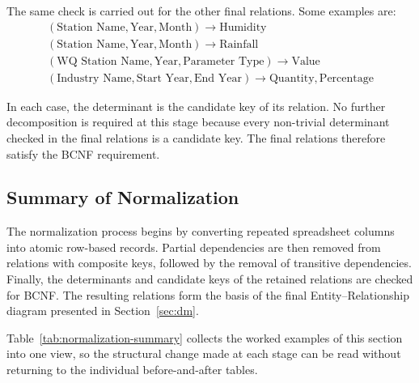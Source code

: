 The same check is carried out for the other final relations. Some examples are:
\begin{gather*}
(\text{Station Name},\text{Year},\text{Month})\rightarrow \text{Humidity}\\
(\text{Station Name},\text{Year},\text{Month})\rightarrow \text{Rainfall}\\
(\text{WQ Station Name},\text{Year},\text{Parameter Type})
\rightarrow \text{Value}\\
(\text{Industry Name},\text{Start Year},\text{End Year})
\rightarrow \text{Quantity},\text{Percentage}
\end{gather*}

In each case, the determinant is the candidate key of its relation. No further
decomposition is required at this stage because every non-trivial determinant
checked in the final relations is a candidate key. The final relations
therefore satisfy the BCNF requirement.

\subsection{Summary of Normalization}
\label{subsec:normalization-summary}

The normalization process begins by converting repeated spreadsheet columns
into atomic row-based records. Partial dependencies are then removed from
relations with composite keys, followed by the removal of transitive
dependencies. Finally, the determinants and candidate keys of the retained
relations are checked for BCNF. The resulting relations form the basis of the
final Entity--Relationship diagram presented in Section~\ref{sec:dm}.

Table~\ref{tab:normalization-summary} collects the worked examples of this
section into one view, so the structural change made at each stage can be read
without returning to the individual before-and-after tables.

